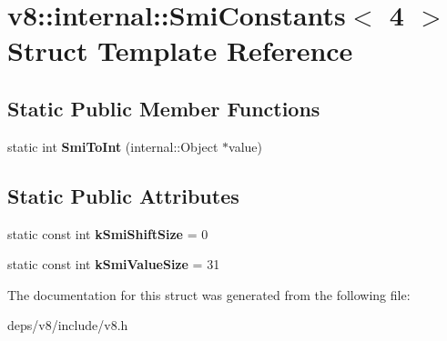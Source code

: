 \hypertarget{structv8_1_1internal_1_1_smi_constants_3_014_01_4}{}\section{v8\+:\+:internal\+:\+:Smi\+Constants$<$ 4 $>$ Struct Template Reference}
\label{structv8_1_1internal_1_1_smi_constants_3_014_01_4}
\subsection*{Static Public Member Functions}
\begin{DoxyCompactItemize}
\item 
\hypertarget{structv8_1_1internal_1_1_smi_constants_3_014_01_4_a535d6ae95fc91da9258e31d810048043}{}static int {\bfseries Smi\+To\+Int} (internal\+::\+Object $\ast$value)\label{structv8_1_1internal_1_1_smi_constants_3_014_01_4_a535d6ae95fc91da9258e31d810048043}

\end{DoxyCompactItemize}
\subsection*{Static Public Attributes}
\begin{DoxyCompactItemize}
\item 
\hypertarget{structv8_1_1internal_1_1_smi_constants_3_014_01_4_a37addf80dd66de1967373c7b3ded1b26}{}static const int {\bfseries k\+Smi\+Shift\+Size} = 0\label{structv8_1_1internal_1_1_smi_constants_3_014_01_4_a37addf80dd66de1967373c7b3ded1b26}

\item 
\hypertarget{structv8_1_1internal_1_1_smi_constants_3_014_01_4_a4a8b755d509d53e452f12c29f39b6bd8}{}static const int {\bfseries k\+Smi\+Value\+Size} = 31\label{structv8_1_1internal_1_1_smi_constants_3_014_01_4_a4a8b755d509d53e452f12c29f39b6bd8}

\end{DoxyCompactItemize}


The documentation for this struct was generated from the following file\+:\begin{DoxyCompactItemize}
\item 
deps/v8/include/v8.\+h\end{DoxyCompactItemize}
